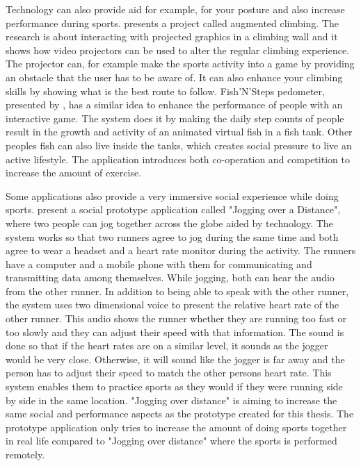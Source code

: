 Technology can also provide aid for example, for your posture and also increase performance during sports. \cite{augmentedClimbing} presents a project called augmented climbing. The research is about interacting with projected graphics in a climbing wall and it shows how video projectors can be used to alter the regular climbing experience. The projector can, for example make the sports activity into a game by providing an obstacle that the user has to be aware of. It can also enhance your climbing skills by showing what is the best route to follow. Fish’N’Steps pedometer, presented by \citep{fishGame}, has a similar idea to enhance the performance of people with an interactive game. The system does it by making the daily step counts of people result in the growth and activity of an animated virtual fish in a fish tank. Other peoples fish can also live inside the tanks, which creates social pressure to live an active lifestyle. The application introduces both co-operation and competition to increase the amount of exercise.

Some applications also provide a very immersive social experience while doing sports.\cite{joggingOverDistance} present a social prototype application called "Jogging over a Distance", where two people can jog together across the globe aided by technology. The system works so that two runners agree to jog during the same time and both agree to wear a headset and a heart rate monitor during the activity. The runners have a computer and a mobile phone with them for communicating and transmitting data among themselves. While jogging, both can hear the audio from the other runner. In addition to being able to speak with the other runner, the system uses two dimensional voice to present the relative heart rate of the other runner. This audio shows the runner whether they are running too fast or too slowly and they can adjust their speed with that information. The sound is done so that if the heart rates are on a similar level, it sounds as the jogger would be very close. Otherwise, it will sound like the jogger is far away and the person has to adjust their speed to match the other persons heart rate. This system enables them to practice sports as they would if they were running side by side in the same location. "Jogging over distance" is aiming to increase the same social and performance aspects as the prototype created for this thesis. The prototype application only tries to increase the amount of doing sports together in real life compared to "Jogging over distance" where the sports is performed remotely.

